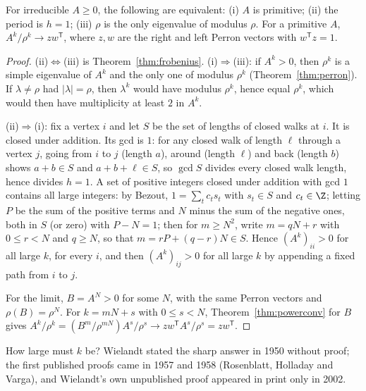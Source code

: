 \begin{theorem}\label{thm:primitive}
For irreducible $A\ge0$, the following are equivalent: (i) $A$ is primitive; (ii) the period is $h=1$; (iii) $\rho$ is the
only eigenvalue of modulus $\rho$. For a primitive $A$, $A^k/\rho^k\to zw^{\mathsf T}$, where $z,w$ are the right and left Perron
vectors with $w^{\mathsf T}z=1$.
\end{theorem}
\begin{proof}
(ii)$\Leftrightarrow$(iii) is Theorem~\ref{thm:frobenius}. (i)$\Rightarrow$(iii): if $A^k>0$, then $\rho^k$ is a simple eigenvalue
of $A^k$ and the only one of modulus $\rho^k$ (Theorem~\ref{thm:perron}). If $\lambda\ne\rho$ had $|\lambda|=\rho$, then $\lambda^k$
would have modulus $\rho^k$, hence equal $\rho^k$, which would then have multiplicity at least $2$ in $A^k$.

(ii)$\Rightarrow$(i): fix a vertex $i$ and let $S$ be the set of lengths of closed walks at $i$. It is closed under addition. Its
gcd is $1$: for any closed walk of length $\ell$ through a vertex $j$, going from $i$ to $j$ (length $a$), around (length $\ell$)
and back (length $b$) shows $a+b\in S$ and $a+b+\ell\in S$, so $\gcd S$ divides every closed walk length, hence divides $h=1$.
A set of positive integers closed under addition with gcd $1$ contains all large integers: by Bezout, $1=\sum_tc_ts_t$ with
$s_t\in S$ and $c_t\in\Z$; letting $P$ be the sum of the positive terms and $N$ minus the sum of the negative ones, both in $S$
(or zero) with $P-N=1$; then for $m\ge N^2$, write $m=qN+r$ with $0\le r<N$ and $q\ge N$, so that $m=rP+(q-r)N\in S$. Hence
$(A^k)_{ii}>0$ for all large $k$, for every $i$, and then $(A^k)_{ij}>0$ for all large $k$ by appending a fixed path from $i$ to $j$.

For the limit, $B=A^N>0$ for some $N$, with the same Perron vectors and $\rho(B)=\rho^N$. For $k=mN+s$ with $0\le s<N$,
Theorem~\ref{thm:powerconv} for $B$ gives $A^k/\rho^k=(B^m/\rho^{mN})A^s/\rho^s\to zw^{\mathsf T}A^s/\rho^s=zw^{\mathsf T}$.
\end{proof}

How large must $k$ be? Wielandt stated the sharp answer in 1950 without proof; the first published proofs came in 1957
and 1958 (Rosenblatt, Holladay and Varga), and Wielandt's own unpublished proof appeared in print only in 2002.

